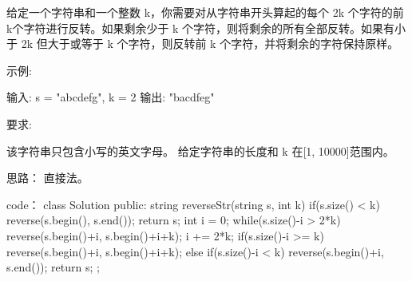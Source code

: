 给定一个字符串和一个整数 k，你需要对从字符串开头算起的每个 2k 个字符的前k个字符进行反转。如果剩余少于 k 个字符，则将剩余的所有全部反转。如果有小于 2k 但大于或等于 k 个字符，则反转前 k 个字符，并将剩余的字符保持原样。

示例:

输入: s = "abcdefg", k = 2
输出: "bacdfeg"

要求:

    该字符串只包含小写的英文字母。
    给定字符串的长度和 k 在[1, 10000]范围内。




















思路：
直接法。


















code：
class Solution {
public:
    string reverseStr(string s, int k) {
        if(s.size() < k)
        {
            reverse(s.begin(), s.end());
            return s;
        }
        int i = 0;
        while(s.size()-i > 2*k)
        {
            reverse(s.begin()+i, s.begin()+i+k);
            i += 2*k;
        }
        if(s.size()-i >= k)
            reverse(s.begin()+i, s.begin()+i+k);
        else if(s.size()-i < k)
            reverse(s.begin()+i, s.end());
        return s;
    }
};